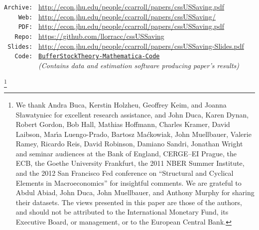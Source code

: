\documentclass[titlepage]{\econtex}
\begin{document}
\parbox{\textwidth}{
\begin{center}
\begin{tabbing}
\texttt{Archive:~} \= \= \url{http://econ.jhu.edu/people/ccarroll/papers/cssUSSaving.pdf} \kill \\  %
\texttt{~~~~Web:~} \> \> \url{http://econ.jhu.edu/people/ccarroll/papers/cssUSSaving/} \\
\texttt{~~~~PDF:~} \> \> \url{http://econ.jhu.edu/people/ccarroll/papers/cssUSSaving.pdf} \\
\texttt{~~~Repo:~} \> \> \url{https://github.com/llorracc/cssUSSaving} \\
\texttt{~Slides:~} \> \> \url{http://econ.jhu.edu/people/ccarroll/papers/cssUSSaving-Slides.pdf} \\
\texttt{~~~Code:~} \> \> \href{http://econ.jhu.edu/people/ccarroll/papers/cssUSSaving/Code/Mathematica-ReadMe.txt}{\texttt{BufferStockTheory-Mathematica-Code}} \\
\texttt{~~~~~~~~~} \> \> {\it (Contains data and estimation software producing paper's results)}
\end{tabbing}
\end{center}
}

\begin{authorsinfo}
\end{authorsinfo}

\thanks{We thank Andra Buca, Kerstin Holzheu, Geoffrey Keim, and Joanna S{\l}awatyniec for excellent research assistance, and John Duca, Karen Dynan, Robert Gordon, Bob Hall, Mathias Hoffmann, Charles Kramer, David Laibson, Mar\'\i a Luengo-Prado, Bartosz Ma\'ckowiak, John Muellbauer, Valerie Ramey, Ricardo Reis, David Robinson, Damiano Sandri, Jonathan Wright and seminar audiences at the Bank of England, CERGE--EI Prague, the ECB, the Goethe University Frankfurt, the 2011 NBER Summer Institute, and the 2012 San Francisco Fed conference on ``Structural and Cyclical Elements in Macroeconomics'' for insightful comments. We are grateful to Abdul Abiad, John Duca, John Muellbauer, and Anthony Murphy for sharing their datasets. The views presented in this paper are those of the authors, and should not be attributed to the International Monetary Fund, its Executive Board, or management, or to the European Central Bank.}
\end{document}
